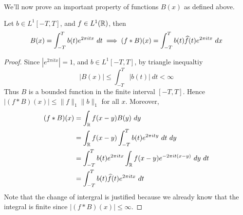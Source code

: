 We'll now prove an important property of functions $B(x)$ as defined above. 

\begin{proposition}
  \label{prop:property_of_analogue_of_trigonometric_functions}
  Let $b \in L^1[-T, T]$, and $f \in L^1(\mathbb R)$, then $$B(x) = \int_{-T}^T b(t)e^{2\pi itx} \ dt \implies (f*B)(x) = \int_{-T}^T b(t) \widehat{f}(t)e^{2\pi itx} \ dx$$
\end{proposition}
\begin{proof}
  Since $|e^{2 \pi itx}| = 1$, and $b \in L^1[-T, T]$, by triangle inequaltiy $$|B(x)| \le \int_{-T}^T |b(t)| \ dt < \infty$$
  Thus $B$ is a bounded function in the finite interval $[-T, T]$. Hence $|(f*B)(x)| \le \|f\|_1 \|b\|_1$ for all $x$. Moreover, 
  \begin{align*}
    (f*B)(x) &= \int_\mathbb R f(x-y)B(y) \ dy \\
    &= \int_\mathbb R f(x-y) \int_{-T}^T b(t)e^{2 \pi ity} \ dt \ dy \\
    &= \int_{-T}^{T}b(t) e^{2 \pi itx}\int_\mathbb R f(x-y) e^{-2 \pi it(x-y)} \ dy \ dt \\
    &= \int_{-T}^T b(t)\widehat{f}(t)e^{2\pi itx} \ dt
  \end{align*}
  Note that the change of intergral is justified because we already know that the integral is finite since $|(f*B)(x)| \le \infty$.
\end{proof}

